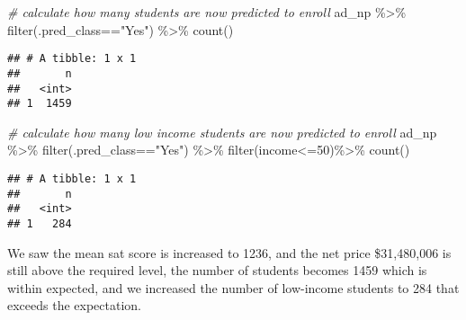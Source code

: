 \documentclass[
]{article}
\newenvironment{Shaded}{\begin{snugshade}}{\end{snugshade}}
\newcommand{\CommentTok}[1]{\textcolor[rgb]{0.56,0.35,0.01}{\textit{#1}}}
\newcommand{\DecValTok}[1]{\textcolor[rgb]{0.00,0.00,0.81}{#1}}
\newcommand{\FunctionTok}[1]{\textcolor[rgb]{0.00,0.00,0.00}{#1}}
\newcommand{\NormalTok}[1]{#1}
\newcommand{\SpecialCharTok}[1]{\textcolor[rgb]{0.00,0.00,0.00}{#1}}
\newcommand{\StringTok}[1]{\textcolor[rgb]{0.31,0.60,0.02}{#1}}
\begin{document}
\begin{Shaded}
\begin{Highlighting}[]
\CommentTok{\# calculate how many students are now predicted to enroll}
\NormalTok{ad\_np }\SpecialCharTok{\%\textgreater{}\%}
  \FunctionTok{filter}\NormalTok{(.pred\_class}\SpecialCharTok{==}\StringTok{"Yes"}\NormalTok{) }\SpecialCharTok{\%\textgreater{}\%}
  \FunctionTok{count}\NormalTok{()}
\end{Highlighting}
\end{Shaded}

\begin{verbatim}
## # A tibble: 1 x 1
##       n
##   <int>
## 1  1459
\end{verbatim}

\begin{Shaded}
\begin{Highlighting}[]
\CommentTok{\# calculate how many low income students are now predicted to enroll}
\NormalTok{ad\_np }\SpecialCharTok{\%\textgreater{}\%}
  \FunctionTok{filter}\NormalTok{(.pred\_class}\SpecialCharTok{==}\StringTok{"Yes"}\NormalTok{) }\SpecialCharTok{\%\textgreater{}\%}
  \FunctionTok{filter}\NormalTok{(income}\SpecialCharTok{\textless{}=}\DecValTok{50}\NormalTok{)}\SpecialCharTok{\%\textgreater{}\%}
  \FunctionTok{count}\NormalTok{()}
\end{Highlighting}
\end{Shaded}

\begin{verbatim}
## # A tibble: 1 x 1
##       n
##   <int>
## 1   284
\end{verbatim}

We saw the mean sat score is increased to 1236, and the net price
\$31,480,006 is still above the required level, the number of students
becomes 1459 which is within expected, and we increased the number of
low-income students to 284 that exceeds the expectation.
\end{document}
